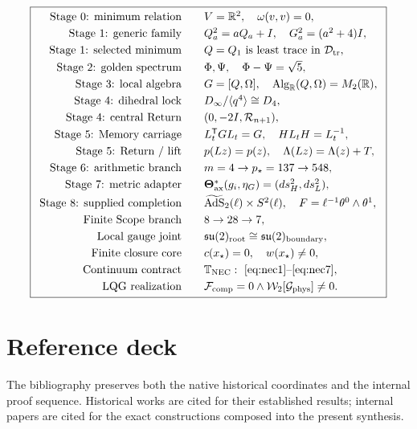 \documentclass[11pt]{article}
\newcommand{\R}{\mathbb R}
\newcommand{\NEC}{\mathbb T_{\mathrm{NEC}}}
\newcommand{\Dtr}{\mathcal D_{\mathrm{tr}}}
\begin{document}
\[
\boxed{
\begin{array}{rcl}
\text{Stage 0: minimum relation}&&V=\R^2,\quad\omega(v,v)=0,\\[1mm]
\text{Stage 1: generic family}&&Q_a^2=aQ_a+I,\quad G_a^2=(a^2+4)I,\\[1mm]
\text{Stage 1: selected minimum}&&Q=Q_1\text{ is least trace in }\Dtr,\\[1mm]
\text{Stage 2: golden spectrum}&&\Phi,\Psi,\quad\Phi-\Psi=\sqrt5,\\[1mm]
\text{Stage 3: local algebra}&&G=[Q,\Omega],\quad\operatorname{Alg}_{\R}(Q,\Omega)=M_2(\R),\\[1mm]
\text{Stage 4: dihedral lock}&&D_\infty/\langle q^4\rangle\cong D_4,\\[1mm]
\text{Stage 4: central Return}&&(0,-2I,\mathcal R_{n+1}),\\[1mm]
\text{Stage 5: Memory carriage}&&L_t^{\mathsf T}GL_t=G,\quad HL_tH=L_t^{-1},\\[1mm]
\text{Stage 5: Return / lift}&&p(Lz)=p(z),\quad\Lambda(Lz)=\Lambda(z)+T,\\[1mm]
\text{Stage 6: arithmetic branch}&&m=4\to p_\star=137\to548,\\[1mm]
\text{Stage 7: metric adapter}&&\boldsymbol\Theta_{\mathrm{ax}}^*(g_i,\eta_G)=(ds_H^2,ds_L^2),\\[1mm]
\text{Stage 8: supplied completion}&&\widetilde{\mathrm{AdS}}_2(\ell)\times S^2(\ell),\quad F=\ell^{-1}\theta^0\wedge\theta^1,\\[1mm]
\text{Finite Scope branch}&&8\to28\to7,\\[1mm]
\text{Local gauge joint}&&\mathfrak{su}(2)_{\rm root}\cong\mathfrak{su}(2)_{\rm boundary},\\[1mm]
\text{Finite closure core}&&c(x_\star)=0,\quad w(x_\star)\neq0,\\[1mm]
\text{Continuum contract}&&\NEC:\ \eqref{eq:nec1}\text{--}\eqref{eq:nec7},\\[1mm]
\text{LQG realization}&&\mathcal F_{\mathrm{comp}}=0\land\mathcal W_2[\mathcal G_{\mathrm{phys}}]\neq0.
\end{array}}
\]

\section{Reference deck}

The bibliography preserves both the native historical coordinates and the internal proof sequence. Historical works are cited for their established results; internal papers are cited for the exact constructions composed into the present synthesis.
\end{document}

